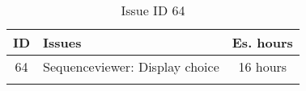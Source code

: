 \begin{longtable} { | c | p{12cm} | c | } 
\hline
	ID 	&	Issues	&		 Es. hours \\\hline
	 64	&	Sequenceviewer: Display choice	&	16 hours \\\hline
\caption{Issue ID 64}
\label{tab:spr4_SVdisplayChoice}
\end{longtable}

